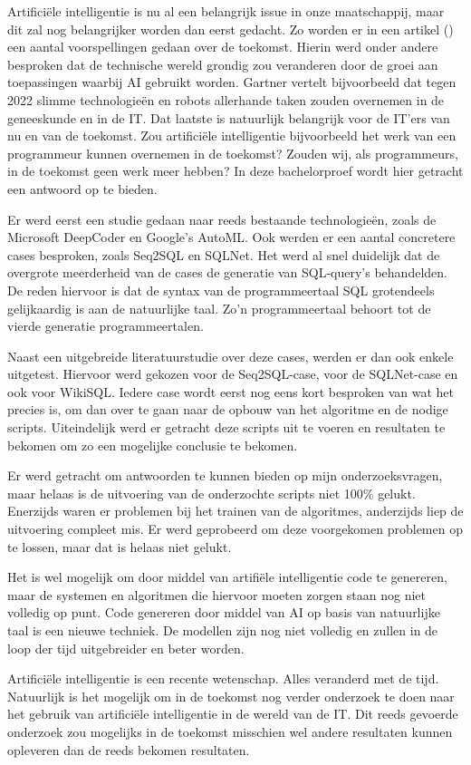 Artificiële intelligentie is nu al een belangrijk issue in onze maatschappij, maar dit zal nog belangrijker worden dan eerst gedacht. Zo worden er in een artikel (\textcite{Gartner}) een aantal voorspellingen gedaan over de toekomst. Hierin werd onder andere besproken dat de technische wereld grondig zou veranderen door de groei aan toepassingen waarbij AI gebruikt worden. Gartner vertelt bijvoorbeeld dat tegen 2022 slimme technologieën en robots allerhande taken zouden overnemen in de geneeskunde en in de IT. Dat laatste is natuurlijk belangrijk voor de IT'ers van nu en van de toekomst. Zou artificiële intelligentie bijvoorbeeld het werk van een programmeur kunnen overnemen in de toekomst? Zouden wij, als programmeurs, in de toekomst geen werk meer hebben? In deze bachelorproef wordt hier getracht een antwoord op te bieden. 

Er werd eerst een studie gedaan naar reeds bestaande technologieën, zoals de Microsoft DeepCoder en Google's AutoML. Ook werden er een aantal concretere cases besproken, zoals Seq2SQL en SQLNet. Het werd al snel duidelijk dat de overgrote meerderheid van de cases de generatie van SQL-query's behandelden. De reden hiervoor is dat de syntax van de programmeertaal SQL grotendeels gelijkaardig is aan de natuurlijke taal. Zo'n programmeertaal behoort tot de vierde generatie programmeertalen.

Naast een uitgebreide literatuurstudie over deze cases, werden er dan ook enkele uitgetest. Hiervoor werd gekozen voor de Seq2SQL-case, voor de SQLNet-case en ook voor WikiSQL. Iedere case wordt eerst nog eens kort besproken van wat het precies is, om dan over te gaan naar de opbouw van het algoritme en de nodige scripts. Uiteindelijk werd er getracht deze scripts uit te voeren en resultaten te bekomen om zo een mogelijke conclusie te bekomen.

Er werd getracht om antwoorden te kunnen bieden op mijn onderzoeksvragen, maar helaas is de uitvoering van de onderzochte scripts niet 100\% gelukt. Enerzijds waren er problemen bij het trainen van de algoritmes, anderzijds liep de uitvoering compleet mis. Er werd geprobeerd om deze voorgekomen problemen op te lossen, maar dat is helaas niet gelukt.

Het is wel mogelijk om door middel van artifiële intelligentie code te genereren, maar de systemen en algoritmen die hiervoor moeten zorgen staan nog niet volledig op punt. Code genereren door middel van AI op basis van natuurlijke taal is een nieuwe techniek. De modellen zijn nog niet volledig en zullen in de loop der tijd uitgebreider en beter worden.

Artificiële intelligentie is een recente wetenschap. Alles veranderd met de tijd. Natuurlijk is het mogelijk om in de toekomst nog verder onderzoek te doen naar het gebruik van artificiële intelligentie in de wereld van de IT. Dit reeds gevoerde onderzoek zou mogelijks in de toekomst misschien wel andere resultaten kunnen opleveren dan de reeds bekomen resultaten. 
